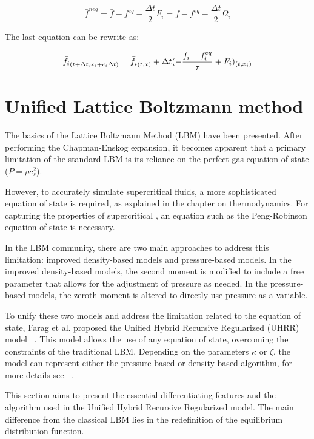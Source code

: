 \begin{equation}
	\bar{f}^{neq} = \bar{f} - f^{eq} - \frac{\Delta t}{2}F_i = f-f^{eq} - \frac{\Delta t}{2}\Omega_i  
\end{equation}

The last equation can be rewrite as:

\begin{equation}
    \Bar{f_i}_{(t+\Delta t, x_i +c_i \Delta t)} = \Bar{f_i}_{(t,x)} + \Delta t(-\frac{f_i - f_i^{eq}}{\tau} +F_i)_{(t, x_i)}
\end{equation}

\section{Unified Lattice Boltzmann method}
The basics of the Lattice Boltzmann Method (LBM) have been presented. After
performing the Chapman-Enskog expansion, it becomes apparent that a primary
limitation of the standard LBM is its reliance on the perfect gas equation of
state ($P$$=$$\rho$$c_s^2$).

However, to accurately simulate supercritical fluids, a more sophisticated
equation of state is required, as explained in the chapter on thermodynamics.
For capturing the properties of supercritical , an equation
such as the Peng-Robinson equation of state is necessary.

In the LBM community, there are two main approaches to address this limitation:
improved density-based models and pressure-based models. In the improved
density-based models, the second moment is modified to include a free parameter
that allows for the adjustment of pressure as needed. In the pressure-based
models, the zeroth moment is altered to directly use pressure as a variable.

To unify these two models and address the limitation related to the equation of
state, Farag et al. proposed the Unified Hybrid Recursive Regularized (UHRR)
model ~\cite{farag2021unified}. This model allows the use of any equation of
state, overcoming the constraints of the traditional LBM. Depending on the
parameters $\kappa$ or $\zeta$, the model can represent either the
pressure-based or density-based algorithm, for more details see
~\cite{farag2021unified}.

This section aims to present the essential differentiating features and the
algorithm used in the Unified Hybrid Recursive Regularized model. The main
difference from the classical LBM lies in the redefinition of the equilibrium
distribution function.


